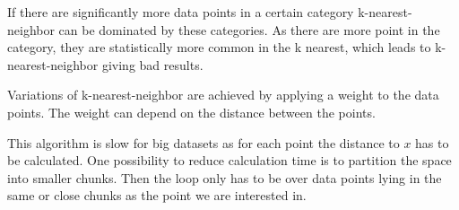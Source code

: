 If there are significantly more data points in a certain category k-nearest-neighbor can be dominated by these categories. As there are more point in the category, they are statistically more common in the k nearest, which leads to k-nearest-neighbor giving bad results.

Variations of k-nearest-neighbor are achieved by applying a weight to the data points. The weight can depend on the distance between the points.

This algorithm is slow for big datasets as for each point the distance to $x$ has to be calculated. One possibility to reduce calculation time is to partition the space into smaller chunks. Then the loop only has to be over data points lying in the same or close chunks as the point we are interested in.
